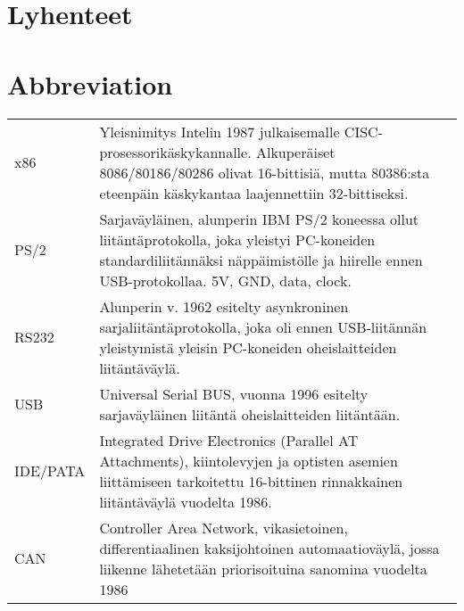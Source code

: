 \documentclass[11pt,a4paper,oneside,article]{memoir}
\begin{document}
\pagestyle{empty} %
\tableofcontents*
\pagestyle{empty} %
\clearpage
\pagestyle{plain}




\pagestyle{empty}
\setlength{\parskip}{1cm}
 {
  \chapter*{Lyhenteet}
} {
  \chapter*{Abbreviation}
}
\begin{table}[h]
\setlength{\tabcolsep}{8pt}
\renewcommand{\arraystretch}{2}
\begin{tabular}{l p{12cm}}
x86 & Yleisnimitys Intelin 1987 julkaisemalle CISC-prosessorikäskykannalle. Alkuperäiset 8086/80186/80286 olivat 16-bittisiä, mutta 80386:sta eteenpäin käskykantaa laajennettiin 32-bittiseksi.\\
PS/2 & Sarjaväyläinen, alunperin IBM PS/2 koneessa ollut liitäntäprotokolla, joka yleistyi PC-koneiden standardiliitännäksi näppäimistölle ja hiirelle ennen USB-protokollaa. 5V, GND, data, clock.\\
RS232 & Alunperin v. 1962 esitelty asynkroninen sarjaliitäntäprotokolla, joka oli ennen USB-liitännän yleistymistä yleisin PC-koneiden oheislaitteiden liitäntäväylä.\\
USB & Universal Serial BUS, vuonna 1996 esitelty sarjaväyläinen liitäntä oheislaitteiden liitäntään.\\
IDE/PATA & Integrated Drive Electronics (Parallel AT Attachments), kiintolevyjen ja optisten asemien liittämiseen tarkoitettu 16-bittinen rinnakkainen liitäntäväylä vuodelta 1986.\\
CAN & Controller Area Network, vikasietoinen, differentiaalinen kaksijohtoinen automaatioväylä, jossa liikenne lähetetään priorisoituina sanomina vuodelta 1986\\
%
\end{tabular}
\end{table}
\end{document}
